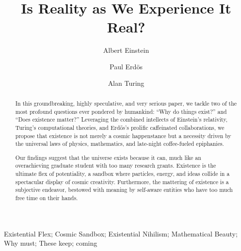 \documentclass[twocolumn,final]{Axon}
\begin{document}
\begin{frontmatter}
\title{Is Reality as We Experience It Real?}
% 
\author[reality]{Albert Einstein}
\author[complexity]{Paul Erd\"{o}s}
\author[bitwise]{Alan Turing}

\address[reality]{Department of Theoretical Reality, Institute for the Institutionalized}
\address[complexity]{Department of Infinite Complexity, University of Stimulating Ideas}
\address[bitwise]{The Rotary Investigations Lab, Institute of Artificial Reasoning}

\begin{abstract}
In this groundbreaking, highly speculative, and very serious paper, we tackle two of the most profound questions ever pondered by humankind: “Why do things exist?” and “Does existence matter?” Leveraging the combined intellects of Einstein’s relativity, Turing’s computational theories, and Erdős’s prolific caffeinated collaborations, we propose that existence is not merely a cosmic happenstance but a necessity driven by the universal laws of physics, mathematics, and late-night coffee-fueled epiphanies.

Our findings suggest that the universe exists because it can, much like an overachieving graduate student with too many research grants. Existence is the ultimate flex of potentiality, a sandbox where particles, energy, and ideas collide in a spectacular display of cosmic creativity. Furthermore, the mattering of existence is a subjective endeavor, bestowed with meaning by self-aware entities who have too much free time on their hands.
\end{abstract}
\begin{keyword}
Existential Flex; Cosmic Sandbox; Existential Nihilism; Mathematical Beauty; Why must; These keep; coming
\end{keyword}
\end{frontmatter}
\end{document}
